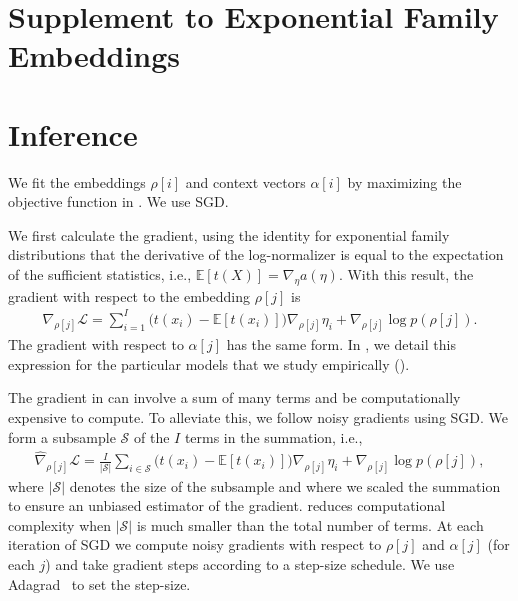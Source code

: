 \documentclass[12pt]{article}
\begin{document}

\small

\clearpage
\normalsize
\appendix
\glsresetall
\section*{\centering Supplement to Exponential Family Embeddings}
\section{Inference}
\label{sec:inference_long}

We fit the embeddings $\rho[i]$ and context vectors $\alpha[i]$ by
maximizing the objective function in .  We use
\gls{SGD}.

We first calculate the gradient, using the identity for exponential
family distributions that the derivative of the log-normalizer is
equal to the expectation of the sufficient statistics, i.e.,
$\mathbb{E}[t(X)] = \nabla_{\eta} a(\eta)$.  With this result, the
gradient with respect to the embedding $\rho[j]$ is
\begin{align}
  \nabla_{\rho[j]}\mathcal{L}= \sum_{i=1}^I \big ( t(x_{i}) - \mathbb{E}[t(x_{i})]\big)\nabla_{\rho[j]}\eta_{i}+\nabla_{\rho[j]}\log p(\rho[j]).
  \label{eqn:gradient_embedding}
\end{align}
The gradient with respect to $\alpha[j]$ has the same form.  In
, we detail this expression for the particular models
that we study empirically ().

The gradient in  can involve a sum of
many terms and be computationally expensive to compute. To alleviate
this, we follow noisy gradients using \gls{SGD}.  We form a subsample
$\mathcal{S}$ of the $I$ terms in the summation, i.e.,
\begin{align}
  \widehat{\nabla}_{\rho[j]} \mathcal{L} =
  \frac{I}{|\mathcal{S}|}\sum_{i\in\mathcal{S}}
  \big( t(x_{i}) - \mathbb{E}[t(x_{i})]\big)\nabla_{\rho[j]}\eta_{i} +
  \nabla_{\rho[j]} \log p(\rho[j]),
  \label{eqn:gradient_embedding_noisy}
\end{align}
where $|\mathcal{S}|$ denotes the size of the subsample %
and where we scaled the summation to ensure an unbiased estimator of the gradient.
 reduces computational complexity
when $|\mathcal{S}|$ is much smaller than the total number of terms.
At each iteration of \gls{SGD} we compute noisy gradients with respect
to $\rho[j]$ and $\alpha[j]$ (for each $j$) and take gradient steps
according to a step-size schedule.  We use Adagrad~\citep{Duchi2011}
to set the step-size.
\end{document}
